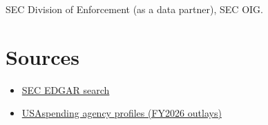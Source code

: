 \documentclass[letterpaper,11pt]{article}
\providecommand{\tightlist}{\setlength{\itemsep}{0pt}\setlength{\parskip}{0pt}}
\begin{document}
SEC Division of Enforcement (as a data partner), SEC OIG.

\hypertarget{sources}{%
\section{Sources}\label{sources}}

\begin{itemize}
\tightlist
\item
  \href{https://www.sec.gov/edgar/search/}{SEC EDGAR search}
\item
  \href{https://www.usaspending.gov/agency}{USAspending agency profiles
  (FY2026 outlays)}
\end{itemize}
\end{document}
